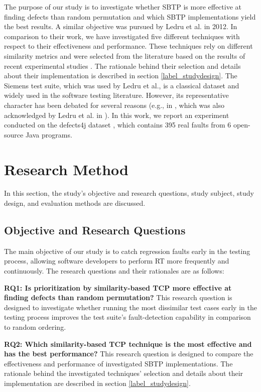 \documentclass[runningheads]{llncs}
\begin{document}
The purpose of our study is to investigate whether SBTP is more effective at finding defects than random permutation and which SBTP implementations yield the best results. A similar objective was pursued by Ledru et al. \cite{ledru2012prioritizing} in 2012. In comparison to their work, we have investigated five different techniques with respect to their effectiveness and performance. These techniques rely on different similarity metrics and were selected from the literature based on the results of recent experimental studies \cite{feldt2008searching,hemmati2010industrial,feldt2016test,ledru2012prioritizing,miranda2018fast}. The rationale behind their selection and details about their implementation is described in section \ref{label_studydesign}. The Siemens test suite, which was used by Ledru et al., is a classical dataset and widely used in the software testing literature. However, its representative character has been debated for several reasons (e.g., in \cite{orso2014software}, which was also acknowledged by Ledru et al. in \cite{ledru2012prioritizing}). In this work, we report an experiment conducted on the defects4j dataset \cite{just2014defects4j}, which contains 395 real faults from 6 open-source Java programs.





\section{Research Method}
In this section, the study's objective and research questions, study subject, study design, and evaluation methods are discussed.

\subsection{Objective and Research Questions}
The main objective of our study is to catch regression faults early in the testing process, allowing software developers to perform RT more frequently and continuously. The research questions and their rationales are as follows:

\textbf{RQ1: Is prioritization by similarity-based TCP more effective at finding defects than random permutation?} This research question is designed to investigate whether running the most dissimilar test cases early in the testing process improves the test suite's fault-detection capability in comparison to random ordering.

\textbf{RQ2: Which similarity-based TCP technique is the most effective and has the best performance?} This research question is designed to compare the effectiveness and performance of investigated SBTP implementations. The rationale behind the investigated techniques' selection and details about their implementation are described in section \ref{label_studydesign}.
\end{document}
